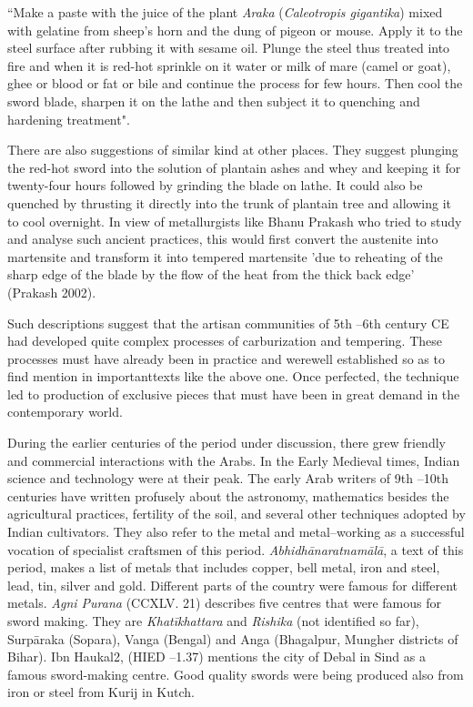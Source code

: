 ``Make a paste with the juice of the plant \textit{Araka} (\textit{Caleotropis gigantika}) mixed with gelatine from sheep's horn and the dung of pigeon or mouse. Apply it to the steel surface after rubbing it with sesame oil. Plunge the steel thus treated into fire and when it is red-hot sprinkle on it water or milk of mare (camel or goat), ghee or blood or fat or bile and continue the process for few hours. Then cool the sword blade, sharpen it on the lathe and then subject it to quenching and hardening treatment".

There are also suggestions of similar kind at other places. They suggest plunging the red-hot sword into the solution of plantain ashes and whey and keeping it for twenty-four hours followed by grinding the blade on lathe. It could also be quenched by thrusting it directly into the trunk of plantain tree and allowing it to cool overnight. In view of metallurgists like Bhanu Prakash who tried to study and analyse such ancient practices, this would first convert the austenite into martensite and transform it into tempered martensite 'due to reheating of the sharp edge of the blade by the flow of the heat from the thick back edge' (Prakash 2002).

Such descriptions suggest that the artisan communities of 5th –6th century CE had developed quite complex processes of carburization and tempering. These processes must have already been in practice and werewell established so as to find mention in importanttexts like the above one. Once perfected, the technique led to production of exclusive pieces that must have been in great demand in the contemporary world.

During the earlier centuries of the period under discussion, there grew friendly and commercial interactions with the Arabs. In the Early Medieval times, Indian science and technology were at their peak. The early Arab writers of 9th –10th centuries have written profusely about the astronomy, mathematics besides the agricultural practices, fertility of the soil, and several other techniques adopted by Indian cultivators. They also refer to the metal and metal–working as a successful vocation of specialist craftsmen of this period. \textit{Abhidhānaratnamālā}, a text of this period, makes a list of metals that includes copper, bell metal, iron and steel, lead, tin, silver and gold. Different parts of the country were famous for different metals. \textit{Agni Purana} (CCXLV. 21) describes five centres that were famous for sword making. They are \textit{Khatīkhattara }and\textit{ Rishika} (not identified so far), Surpāraka (Sopara), Vanga (Bengal) and Anga (Bhagalpur, Mungher districts of Bihar). Ibn Haukal2, (HIED –1.37) mentions the city of Debal in Sind as a famous sword-making centre. Good quality swords were being produced also from iron or steel from Kurij in Kutch.


